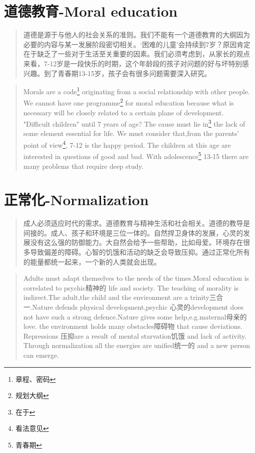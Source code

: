 \documentclass[lang=cn,10pt]{elegantbook}
\begin{document}
\chapter{道德教育-Moral education}

\begin{quote}
  {\small 道德是源于与他人的社会关系的准则。我们不能有一个道德教育的大纲因为必要的内容与某一发展阶段密切相关。‘困难的儿童’会持续到7岁？原因肯定在于缺乏了一些对于生活至关重要的因素。我们必须考虑到，从家长的观点来看，7-12岁是一段快乐的时期，这个年龄段的孩子对问题的好与坏特别感兴趣。到了青春期13-15岁，孩子会有很多问题需要深入研究。}
\end{quote}

\begin{quote}
  {\small Morals are a code\footnote{章程、密码} originating from a social relationship with other people. We cannot have one programme\footnote{规划大纲} for moral education because what is necessary will be closely related to a certain plane of development. "Difficult children" until 7 years of age? The cause must lie in\footnote{在于} the lack of some element essential for life. We must consider that,from the parents' point of view\footnote{看法意见}, 7-12 is the happy period. The children at this age are interested in questions of good and bad. With adolescence\footnote{青春期} 13-15 there are many problems that require deep study.}
\end{quote}

\chapter{正常化-Normalization}

\begin{quote}
  {\small 成人必须适应时代的需求。道德教育与精神生活和社会相关。道德的教导是间接的。成人、孩子和环境是三位一体的。自然捍卫身体的发展，心灵的发展没有这么强的防御能力。大自然会给予一些帮助，比如母爱。环境存在很多导致偏差的障碍。心智的饥饿和活动的缺乏会导致压抑。通过正常化所有的能量都统一起来，一个新的人类就会出现。}
\end{quote}

\begin{tcolorbox}
\begin{quote}
  {\small Adults must adapt themselves to the needs of the times.Moral education is correlated to psychic精神的 life and society. The teaching of morality is indirect.The adult,the child and the environment are a trinity三合一.Nature defends physical development,psychic 心灵的development does not have such a strong defence.Nature gives some help,e.g.maternal母亲的 love. the environment holds many obstacles障碍物 that cause deviations. Repressions 压抑are a result of mental starvation饥饿 and lack of activity. Through normalization all the energies are unified统一的 and a new person can emerge.}
\end{quote}
\end{tcolorbox}
\end{document}
